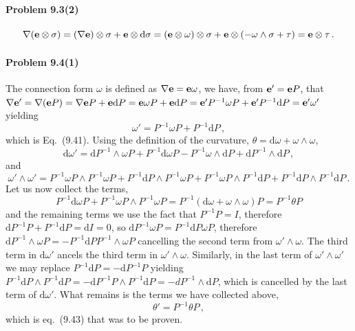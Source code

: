 \documentclass[a4paper,12pt]{article}
\def\d{\mathrm{d}}
\newcommand{\problem}[1]{\paragraph{Problem #1}}
\begin{document}
\problem{9.3(2)}
\[
 \nabla({\bf e}\otimes \sigma) = (\nabla{\bf e})\otimes\sigma + {\bf e}\otimes \d\sigma = ({\bf e}\otimes\omega)\otimes \sigma + {\bf e}\otimes(-\omega\wedge \sigma + \tau ) = {\bf e}\otimes \tau\,.
\]


\problem{9.4(1)} The connection form $\omega$ is defined as $\nabla {\bf e} = {\bf e}\omega$, we have, from ${\bf e}' = {\bf e}P$, that $\nabla {\bf e'} = \nabla({\bf e}P) = \nabla {\bf e}P + {\bf e}\d P = {\bf e}\omega P + {\bf e}\d P = {\bf e}' P^{-1}\omega P + {\bf e}' P^{-1}\d P = {\bf e}' \omega'$ yielding
\[
 \omega ' = P^{-1}\omega P + P^{-1}\d P\,,
\]
which is Eq.\ (9.41). Using the definition of the curvature, $\theta = \d \omega + \omega \wedge \omega$,
\[
 \d\omega' = \d P^{-1}\wedge \omega P + P^{-1}\d \omega P - P^{-1}\omega \wedge\d P + \d P^{-1}\wedge \d P\,,
\]
and
\[
 \omega' \wedge \omega' = P^{-1}\omega P \wedge P^{-1}\omega P +  P^{-1}\d P \wedge P^{-1}\omega P+P^{-1}\omega P \wedge P^{-1}\d P + P^{-1}\d P \wedge P^{-1}\d P\,.
\]
Let us now collect the terms,
\[
 P^{-1}\d\omega P + P^{-1}\omega P \wedge P^{-1}\omega P = P^{-1}(\d\omega + \omega \wedge \omega )P=P^{-1}\theta P
\]
and the remaining terms we use the fact that $P^{-1}P=I$, therefore $\d P^{-1} P + P^{-1}\d P =\d I = 0$, so $\d P^{-1}\omega P = P^{-1}\d P \omega P$, therefore $\d P^{-1}\wedge \omega P = -P^{-1}\d P P^{-1}\wedge \omega P$ cancelling the second term from $\omega'\wedge \omega$. The third term in $\d\omega'$ ancels the third term in $\omega'\wedge\omega$. Similarly, in the last term of $\omega'\wedge \omega'$ we may replace $P^{-1}\d P = -\d P^{-1} P$ yielding
$P^{-1}\d P \wedge P^{-1}\d P =- \d P^{-1} P\wedge P^{-1}\d P = -d P^{-1}\wedge \d P$, which is cancelled by the last term of $\d\omega'$. What remains is the terms we have collected above,
\[
 \theta' = P^{-1}\theta P\,,
\]
which is eq.\ (9.43) that was to be proven.

\end{document}
